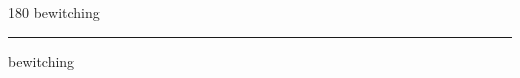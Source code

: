 
\begin{frame}
\begin{center}
\begin{turn}{180}
{\fontsize{2.5cm}{1em}\selectfont bewitching}
\end{turn}
\vspace{1em}\par  
\hrule
\vspace{1em}\par  
{\fontsize{2.5cm}{1em}\selectfont bewitching}
\end{center}
\end{frame}
